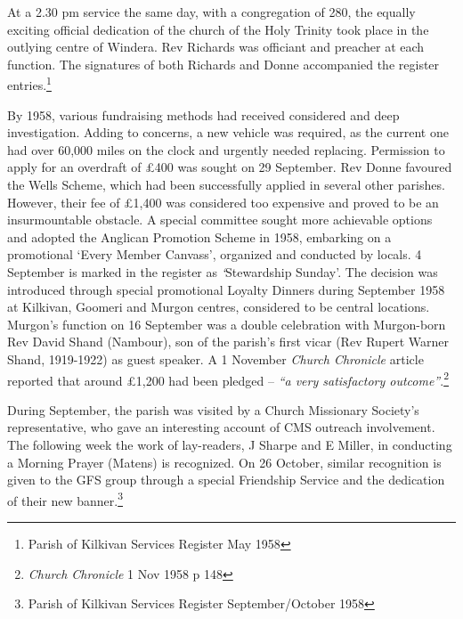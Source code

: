 At a 2.30 pm service the same day, with a congregation of 280, the equally exciting official dedication of the church of the Holy Trinity took place in the outlying centre of Windera. Rev Richards was officiant and preacher at each function. The signatures of both Richards and Donne accompanied the register entries.\footnote{Parish of Kilkivan Services Register May 1958}


By 1958, various fundraising methods had received considered and deep investigation. Adding to concerns, a new vehicle was required, as the current one had over 60,000 miles on the clock and urgently needed replacing. Permission to apply for an overdraft of \pounds400 was sought on 29 September. Rev Donne favoured the Wells Scheme, which had been successfully applied in several other parishes. However, their fee of \pounds1,400 was considered too expensive and proved to be an insurmountable obstacle. A special committee sought more achievable options and adopted the Anglican Promotion Scheme in 1958, embarking on a promotional `Every Member Canvass', organized and conducted by locals. 4 September is marked in the register as \emph{`}Stewardship Sunday'. The decision was introduced through special promotional Loyalty Dinners during September 1958 at Kilkivan, Goomeri and Murgon centres, considered to be central locations. Murgon's function on 16 September was a double celebration with Murgon-born Rev David Shand (Nambour), son of the parish's first vicar (Rev Rupert Warner Shand, 1919-1922) as guest speaker. A 1 November \emph{Church Chronicle} article reported that around \pounds1,200 had been pledged -- \emph{``a very satisfactory outcome''}.\footnote{\emph{Church Chronicle} 1 Nov 1958 p 148}


During September, the parish was visited by a Church Missionary Society's representative, who gave an interesting account of CMS outreach involvement. The following week the work of lay-readers, J Sharpe and E Miller, in conducting a Morning Prayer (Matens) is recognized. On 26 October, similar recognition is given to the GFS group through a special Friendship Service and the dedication of their new banner.\footnote{Parish of Kilkivan Services Register September/October 1958}








